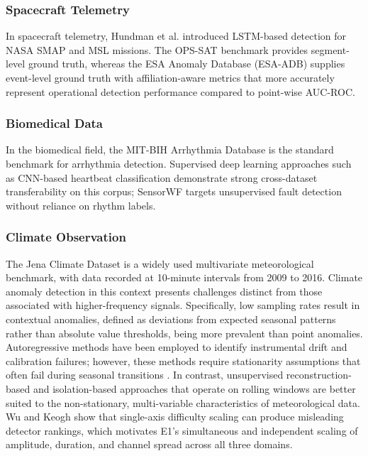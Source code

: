 \documentclass[conference]{IEEEtran}
\begin{document}
\subsubsection{Spacecraft Telemetry}
In spacecraft telemetry, Hundman et al. \cite{hundman2018detecting} introduced LSTM-based detection for NASA SMAP and MSL missions. The OPS-SAT benchmark \cite{ruszczak2025opssat} provides segment-level ground truth, whereas the ESA Anomaly Database (ESA-ADB) \cite{esa_adb2024} supplies event-level ground truth with affiliation-aware metrics that more accurately represent operational detection performance compared to point-wise AUC-ROC. 

\subsubsection{Biomedical Data}

In the biomedical field, the MIT-BIH Arrhythmia Database \cite{moody2001mitbih} is the standard benchmark for arrhythmia detection. Supervised deep learning approaches such as CNN-based heartbeat classification \cite{kachuee2018ecgclass} demonstrate strong cross-dataset transferability on this corpus; SensorWF targets unsupervised fault detection without reliance on rhythm labels.

\subsubsection{Climate Observation}

The Jena Climate Dataset \cite{jena_climate} is a widely used multivariate meteorological benchmark, with data recorded at 10-minute intervals from 2009 to 2016. Climate anomaly detection in this context presents challenges distinct from those associated with higher-frequency signals. Specifically, low sampling rates result in contextual anomalies, defined as deviations from expected seasonal patterns rather than absolute value thresholds, being more prevalent than point anomalies. Autoregressive methods have been employed to identify instrumental drift and calibration failures; however, these methods require stationarity assumptions that often fail during seasonal transitions \cite{martinez2020climate}. In contrast, unsupervised reconstruction-based and isolation-based approaches that operate on rolling windows are better suited to the non-stationary, multi-variable characteristics of meteorological data. Wu and Keogh \cite{wu2022benchmarks} show that single-axis difficulty scaling can produce misleading detector rankings, which motivates E1's simultaneous and independent scaling of amplitude, duration, and channel spread across all three domains.
\end{document}

